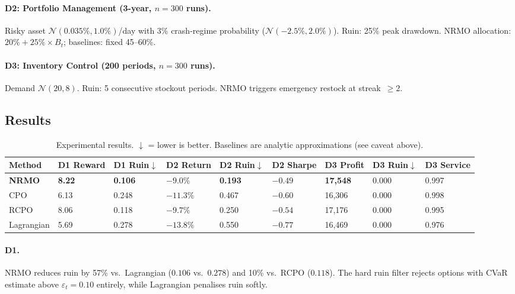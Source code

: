 \paragraph{D2: Portfolio Management (3-year, $n = 300$ runs).}
Risky asset $\mathcal{N}(0.035\%, 1.0\%)$/day with 3\%
crash-regime probability ($\mathcal{N}(-2.5\%, 2.0\%)$). Ruin: 25\%
peak drawdown. NRMO allocation: $20\% + 25\% \times B_t$;
baselines: fixed 45--60\%.

\paragraph{D3: Inventory Control (200 periods, $n = 300$ runs).}
Demand $\mathcal{N}(20, 8)$. Ruin: 5 consecutive stockout periods.
NRMO triggers emergency restock at streak~$\ge 2$.

\subsection{Results}
\label{sec:arxiv-results}

\begin{table}[ht]
\centering
\scriptsize
\begin{tabularx}{\linewidth}{lXXXXXXXX}
\toprule
\textbf{Method} & \textbf{D1 Reward} & \textbf{D1 Ruin$\downarrow$}
& \textbf{D2 Return} & \textbf{D2 Ruin$\downarrow$} &
\textbf{D2 Sharpe} & \textbf{D3 Profit} &
\textbf{D3 Ruin$\downarrow$} & \textbf{D3 Service} \\
\midrule
\textbf{NRMO} & \textbf{8.22} & \textbf{0.106} & $-9.0\%$
& \textbf{0.193} & $-0.49$ & \textbf{17{,}548} & 0.000 & 0.997 \\
CPO & 6.13 & 0.248 & $-11.3\%$ & 0.467 & $-0.60$ & 16{,}306 & 0.000
& 0.998 \\
RCPO & 8.06 & 0.118 & $-9.7\%$ & 0.250 & $-0.54$ & 17{,}176 & 0.000
& 0.995 \\
Lagrangian & 5.69 & 0.278 & $-13.8\%$ & 0.550 & $-0.77$ & 16{,}469
& 0.000 & 0.976 \\
\bottomrule
\end{tabularx}
\caption[arXiv experimental results]{Experimental results.
$\downarrow$ = lower is better. Baselines are analytic
approximations (see caveat above).}
\label{tab:arxiv-empirical}
\end{table}

\paragraph{D1.}
NRMO reduces ruin by 57\% vs.~Lagrangian ($0.106$ vs.~$0.278$) and
10\% vs.~RCPO ($0.118$). The hard ruin filter rejects options with
CVaR estimate above $\varepsilon_t = 0.10$ entirely, while
Lagrangian penalises ruin softly.

